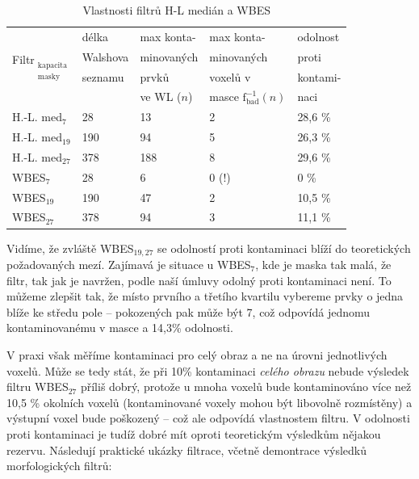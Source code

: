 \begin{table}[h]
    \begin{center}
    \begin{tabular}{lllll}
      \toprule
      \multirow{4}{*}{Filtr$_{\mathrm{\substack{kapacita\\ masky}}}$}
                                        &délka   & max konta-  & max konta- & odolnost    \\
                                        &Walshova& minovaných  & minovaných & proti       \\
                                        &seznamu & prvků       & voxelů v   & kontami-    \\
                                        &        & ve WL ($n$) & masce $\mathrm{f_{bad}^{-1}}(n)$ & naci \\
      \midrule
      H.-L. med$_{\mathrm{7}}$          & 28  & 13  & 2                 & 28,6 \%      \\
      H.-L. med$_{\mathrm{19}}$         & 190 & 94  & 5                 & 26,3 \%      \\
      H.-L. med$_{\mathrm{27}}$         & 378 & 188 & 8                 & 29,6 \%      \\
      WBES$_{\mathrm{7}}$               & 28  & 6   & 0 (!)             & 0 \%         \\
      WBES$_{\mathrm{19}}$              & 190 & 47  & 2                 & 10,5 \%      \\
      WBES$_{\mathrm{27}}$              & 378 & 94  & 3                 & 11,1 \%      \\
      \bottomrule
    \end{tabular}
    \caption{Vlastnosti filtrů H-L medián a WBES}
    \end{center}
\end{table}\label{tab WBES}

     Vidíme, že zvláště WBES$_{\mathrm{19,27}}$ se odolností proti kontaminaci blíží do teoretických požadovaných mezí. Zajímavá je situace u WBES$_{\mathrm{7}}$, kde je maska tak malá, že filtr, tak jak je navržen, podle naší úmluvy odolný proti kontaminaci není. To můžeme zlepšit tak, že místo prvního a třetího kvartilu vybereme prvky o jedna blíže ke středu pole -- pokozených pak může být 7, což odpovídá jednomu kontaminovanému v masce a 14,3\% odolnosti.
     \vspace{0.5cm}

     V praxi však měříme kontaminaci pro celý obraz a ne na úrovni jednotlivých voxelů. Může se tedy stát, že při 10\% kontaminaci \emph{celého obrazu} nebude výsledek filtru WBES$_{\mathrm{27}}$ příliš dobrý, protože u mnoha voxelů bude kontaminováno více než 10,5 \% okolních voxelů (kontaminované voxely mohou být libovolně rozmístěny) a výstupní voxel bude poškozený -- což ale odpovídá vlastnostem filtru. V odolnosti proti kontaminaci je tudíž dobré mít oproti teoretickým výsledkům nějakou rezervu. Následují praktické ukázky filtrace, včetně demontrace výsledků morfologických filtrů:
     
